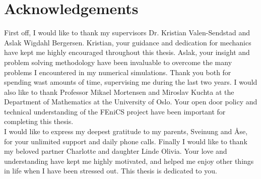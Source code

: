 \section*{Acknowledgements}


First off, I would like to thank my supervisors Dr. Kristian Valen-Sendstad and Aslak Wigdahl Bergersen. Kristian, your guidance and dedication for mechanics have kept me highly encouraged throughout this thesis. Aslak, your insight and problem solving methodology have been invaluable to overcome the many problems I encountered in my numerical simulations. Thank you both for spending wast amounts of time, supervising me during the last two years. I would also like to thank Professor Mikael Mortensen and Miroslav Kuchta at the Department of Mathematics at the University of Oslo. Your open door policy and technical understanding of the FEniCS project have been important for completing this thesis. \\

I would like to express my deepest gratitude to my parents, Sveinung and Åse, for your unlimited support and daily phone calls. Finally I would like to thank my beloved partner Charlotte and daughter Linde Olivia. Your love and understanding have kept me highly motivated, and helped me enjoy other things in life when I have been stressed out.   This thesis is dedicated to you.

